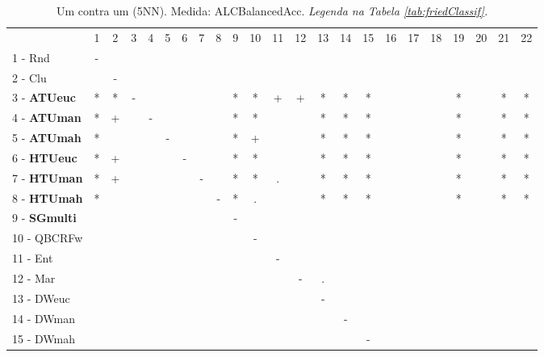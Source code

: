 \begin{table}[h]
\caption{Um contra um (5NN). Medida: ALCBalancedAcc. \textit{Legenda na Tabela \ref{tab:friedClassif}.}}
\begin{center}\begin{tabular}{lcc|cc|cc|cc|cc|cc|cc|cc|cc|cc|cc}
 			& 1 & 2 & 3 & 4 & 5 & 6 & 7 & 8 & 9 & 10 & 11 & 12 & 13 & 14 & 15 & 16 & 17 & 18 & 19 & 20 & 21 & 22\\
1 - Rnd  	& - &   &   &   &   &   &   &   &   &   &   &   &   &   &   &   &   &   &   &   &   &   \\
2 - Clu  	&   & - &   &   &   &   &   &   &   &   &   &   &   &   &   &   &   &   &   &   &   &   \\ \hline
3 - \textbf{ATUeuc}	& * & * & - &   &   &   &   &   & * & * & + & + & * & * & * &   &   &   & * &   & * & * \\
4 - \textbf{ATUman}	& * & + &   & - &   &   &   &   & * & * &   &   & * & * & * &   &   &   & * &   & * & * \\ \hline
5 - \textbf{ATUmah}	& * &   &   &   & - &   &   &   & * & + &   &   & * & * & * &   &   &   & * &   & * & * \\
6 - \textbf{HTUeuc}	& * & + &   &   &   & - &   &   & * & * &   &   & * & * & * &   &   &   & * &   & * & * \\ \hline
7 - \textbf{HTUman}	& * & + &   &   &   &   & - &   & * & * & . &   & * & * & * &   &   &   & * &   & * & * \\
8 - \textbf{HTUmah}	& * &   &   &   &   &   &   & - & * & . &   &   & * & * & * &   &   &   & * &   & * & * \\ \hline
9 - \textbf{SGmulti}	&   &   &   &   &   &   &   &   & - &   &   &   &   &   &   &   &   &   &   &   &   &   \\
10 - QBCRFw	&   &   &   &   &   &   &   &   &   & - &   &   &   &   &   &   &   &   &   &   &   &   \\ \hline
11 - Ent  	&   &   &   &   &   &   &   &   &   &   & - &   &   &   &   &   &   &   &   &   &   &   \\
12 - Mar  	&   &   &   &   &   &   &   &   &   &   &   & - & . &   &   &   &   &   &   &   &   &   \\ \hline
13 - DWeuc	&   &   &   &   &   &   &   &   &   &   &   &   & - &   &   &   &   &   &   &   &   &   \\
14 - DWman	&   &   &   &   &   &   &   &   &   &   &   &   &   & - &   &   &   &   &   &   &   &   \\ \hline
15 - DWmah	&   &   &   &   &   &   &   &   &   &   &   &   &   &   & - &   &   &   &   &   &   &   \\

\end{tabular}
\end{center}
\end{table}
